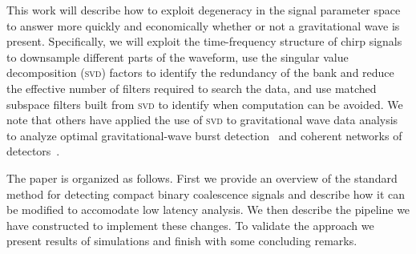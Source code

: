 This work will describe how to exploit degeneracy in the signal parameter space
to answer more quickly and economically whether or not a gravitational wave is
present.
Specifically, we will exploit the time-frequency structure of chirp
signals to downsample different parts of the waveform, use the singular value
decomposition (\textsc{svd}) factors to identify the redundancy of the bank and
reduce the effective number of filters required to search the data, and use
matched subspace filters built from \textsc{svd} to identify when computation
can be avoided.  We note that others have applied the use of \textsc{svd} to
gravitational wave data analysis to analyze optimal gravitational-wave burst
detection~\cite{bradyraymajumder2004, heng2008} and coherent networks of
detectors~\cite{wen2008}.

The paper is organized as follows.  First we provide an overview of the 
standard method for detecting compact binary coalescence signals and
describe how it can be modified to accomodate low latency analysis.  We
then describe the pipeline we have constructed to implement these changes.
To validate the approach we present results of simulations and finish
with some concluding remarks.
